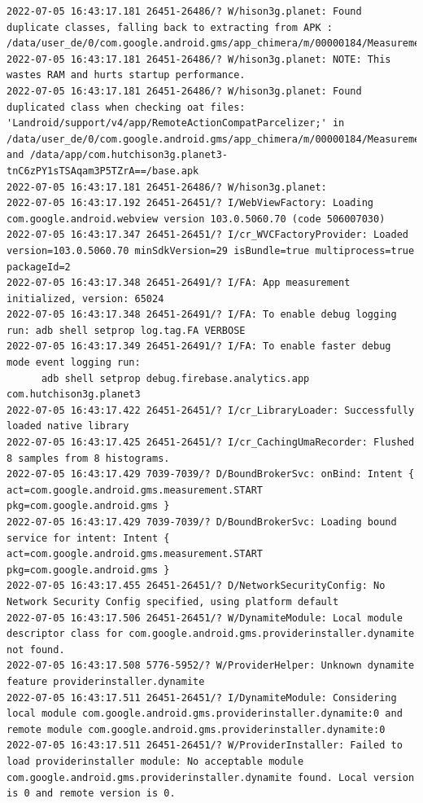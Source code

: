 \documentclass[a4paper,12pt]{book}
\begin{document}
\begin{lstlisting}
2022-07-05 16:43:17.181 26451-26486/? W/hison3g.planet: Found duplicate classes, falling back to extracting from APK : /data/user_de/0/com.google.android.gms/app_chimera/m/00000184/MeasurementDynamite.apk
2022-07-05 16:43:17.181 26451-26486/? W/hison3g.planet: NOTE: This wastes RAM and hurts startup performance.
2022-07-05 16:43:17.181 26451-26486/? W/hison3g.planet: Found duplicated class when checking oat files: 'Landroid/support/v4/app/RemoteActionCompatParcelizer;' in /data/user_de/0/com.google.android.gms/app_chimera/m/00000184/MeasurementDynamite.apk and /data/app/com.hutchison3g.planet3-tnC6zPY1sTSAqam3P5TZrA==/base.apk
2022-07-05 16:43:17.181 26451-26486/? W/hison3g.planet: 
2022-07-05 16:43:17.192 26451-26451/? I/WebViewFactory: Loading com.google.android.webview version 103.0.5060.70 (code 506007030)
2022-07-05 16:43:17.347 26451-26451/? I/cr_WVCFactoryProvider: Loaded version=103.0.5060.70 minSdkVersion=29 isBundle=true multiprocess=true packageId=2
2022-07-05 16:43:17.348 26451-26491/? I/FA: App measurement initialized, version: 65024
2022-07-05 16:43:17.348 26451-26491/? I/FA: To enable debug logging run: adb shell setprop log.tag.FA VERBOSE
2022-07-05 16:43:17.349 26451-26491/? I/FA: To enable faster debug mode event logging run:
      adb shell setprop debug.firebase.analytics.app com.hutchison3g.planet3
2022-07-05 16:43:17.422 26451-26451/? I/cr_LibraryLoader: Successfully loaded native library
2022-07-05 16:43:17.425 26451-26451/? I/cr_CachingUmaRecorder: Flushed 8 samples from 8 histograms.
2022-07-05 16:43:17.429 7039-7039/? D/BoundBrokerSvc: onBind: Intent { act=com.google.android.gms.measurement.START pkg=com.google.android.gms }
2022-07-05 16:43:17.429 7039-7039/? D/BoundBrokerSvc: Loading bound service for intent: Intent { act=com.google.android.gms.measurement.START pkg=com.google.android.gms }
2022-07-05 16:43:17.455 26451-26451/? D/NetworkSecurityConfig: No Network Security Config specified, using platform default
2022-07-05 16:43:17.506 26451-26451/? W/DynamiteModule: Local module descriptor class for com.google.android.gms.providerinstaller.dynamite not found.
2022-07-05 16:43:17.508 5776-5952/? W/ProviderHelper: Unknown dynamite feature providerinstaller.dynamite
2022-07-05 16:43:17.511 26451-26451/? I/DynamiteModule: Considering local module com.google.android.gms.providerinstaller.dynamite:0 and remote module com.google.android.gms.providerinstaller.dynamite:0
2022-07-05 16:43:17.511 26451-26451/? W/ProviderInstaller: Failed to load providerinstaller module: No acceptable module com.google.android.gms.providerinstaller.dynamite found. Local version is 0 and remote version is 0.

\end{lstlisting}
\end{document}
